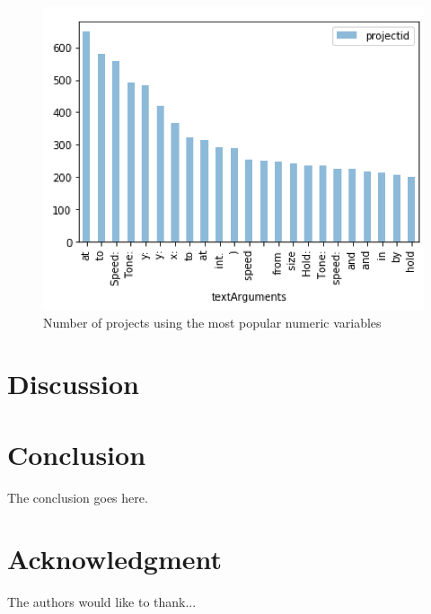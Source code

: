 \documentclass[conference]{IEEEtran}
\begin{document}
\begin{figure}
	\begin{center}
		\includegraphics[width=\columnwidth]{fig/labels}
		\caption{Number of projects using the most popular numeric variables}
		\label{fig:labels}
	\end{center}
\end{figure} 



 \section{Discussion}


\section{Conclusion}
The conclusion goes here.






\section*{Acknowledgment}


The authors would like to thank...





\end{document}
